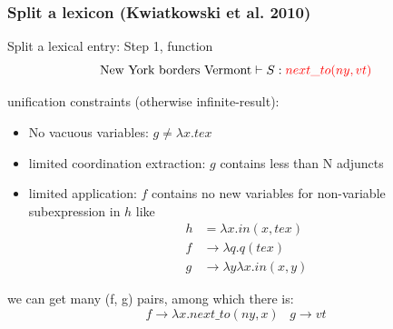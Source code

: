 \documentclass{beamer}
\begin{document}
\begin{frame}
    \frametitle{Split a lexicon (Kwiatkowski et al. 2010)}

    Split a lexical entry: Step 1, function
    \[
        \text{New York borders Vermont} \vdash S: \textcolor{red}{next\_to(ny, vt)}
    \]

    unification constraints (otherwise infinite-result):
    \begin{itemize}
        \item No vacuous variables: $g \ne \lambda x . tex$
        \item limited coordination extraction: $g$ contains less than N adjuncts
        \item limited application: $f$ contains no new variables for non-variable
            subexpression in $h$ like 
            \begin{align*}
                h &= \lambda x . in(x, tex) \\
                f &\to \lambda q . q(tex) \\
                g &\to \lambda y \lambda x . in(x, y)
            \end{align*}
    \end{itemize}

    \pause

    we can get many (f, g) pairs, among which there is: 
    \[
        f \to \lambda x . next\_to(ny, x)\,\,\,\,\, g \to vt
    \]
\end{frame}
\end{document}
